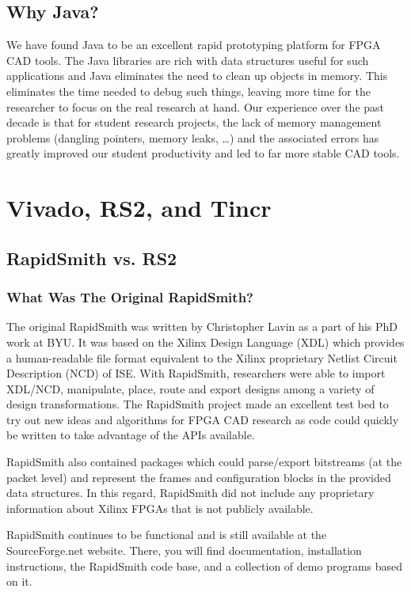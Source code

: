 \documentclass[12pt]{article}
\begin{document}
\subsection{Why Java?}
We have found Java to be an excellent rapid prototyping platform for FPGA CAD
tools.  The Java libraries are rich with data structures useful for such
applications and Java eliminates the need to clean up objects in memory.  This
eliminates the time needed to debug such things, leaving more time for the
researcher to focus on the real research at hand.  Our experience over the past
decade is that for student research projects, the lack of memory management
problems (dangling pointers, memory leaks, …) and the associated errors has
greatly improved our student productivity and led to far more stable CAD tools.


\section{Vivado, RS2, and Tincr}
\subsection{RapidSmith vs. RS2}
\subsubsection{What Was The Original RapidSmith?}
The original RapidSmith was written by Christopher Lavin as a part of his PhD
work at BYU.  It was based on the Xilinx Design Language (XDL) which provides a
human-readable file format equivalent to the Xilinx proprietary Netlist Circuit
Description (NCD) of ISE.  With RapidSmith, researchers were able to import
XDL/NCD, manipulate, place, route and export designs among a variety of design
transformations.  The RapidSmith project made an excellent test bed to try out
new ideas and algorithms for FPGA CAD research as code could quickly be written
to take advantage of the APIs available.

RapidSmith also contained packages which could parse/export bitstreams (at the
packet level) and represent the frames and configuration blocks in the provided
data structures.  In this regard, RapidSmith did not include any proprietary
information about Xilinx FPGAs that is not publicly available.

RapidSmith continues to be functional and is still available at the
SourceForge.net website.  There, you will find documentation, installation
instructions, the RapidSmith code base, and a collection of demo programs based
on it.
\end{document}
